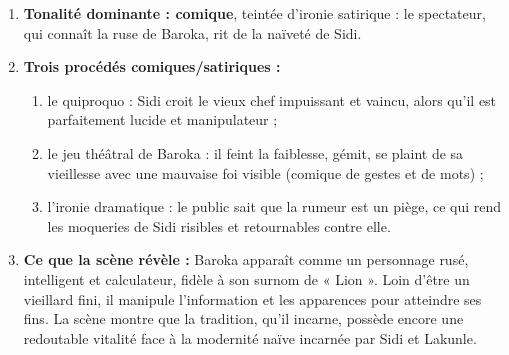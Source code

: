 \documentclass[11pt]{article}
\newcommand{\cle}[1]{{\popxbold\color{popdark}#1}}
\begin{document}
\begin{corrige}
\begin{enumerate}
\item \textbf{Tonalité dominante : \cle{comique}}, teintée d'\cle{ironie satirique} : le spectateur, qui connaît la ruse de Baroka, rit de la naïveté de Sidi.
\item \textbf{Trois \cle{procédés comiques/satiriques} :}
\begin{enumerate}
\item[a)] le \cle{quiproquo} : Sidi croit le vieux chef impuissant et vaincu, alors qu'il est parfaitement lucide et manipulateur ;
\item[b)] le \cle{jeu théâtral de Baroka} : il feint la faiblesse, gémit, se plaint de sa vieillesse avec une \cle{mauvaise foi} visible (\cle{comique de gestes} et de \cle{mots}) ;
\item[c)] l'\cle{ironie dramatique} : le public sait que la rumeur est un piège, ce qui rend les moqueries de Sidi risibles et \cle{retournables contre elle}.
\end{enumerate}
\item \textbf{Ce que la scène révèle :} Baroka apparaît comme un personnage \cle{rusé}, \cle{intelligent} et \cle{calculateur}, fidèle à son surnom de « \cle{Lion} ». Loin d'être un vieillard fini, il \cle{manipule l'information} et les \cle{apparences} pour atteindre ses fins. La scène montre que la \cle{tradition}, qu'il incarne, possède encore une \cle{redoutable vitalité} face à la modernité naïve incarnée par Sidi et Lakunle.
\end{enumerate}
\end{corrige}
\end{document}
